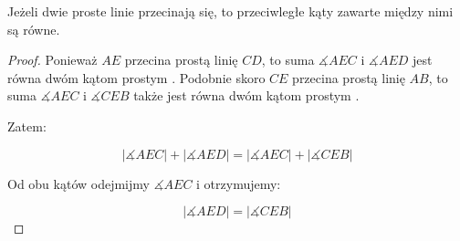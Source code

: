 \documentclass[12pt, a4paper]{scrartcl}
\begin{document}
\begin{theorem}
    Jeżeli dwie proste linie przecinają się, to przeciwległe kąty zawarte
    między nimi są równe.

    \begin{figure}[!h]
        \begin{center}
        \end{center}
    \end{figure}

    \begin{proof}
        Ponieważ \(AE\) przecina prostą linię \(CD\), to suma \(\measuredangle
        AEC\) i \(\measuredangle AED\) jest równa dwóm kątom prostym
        . Podobnie skoro \(CE\) przecina prostą linię \(AB\), to
        suma \(\measuredangle AEC\) i \(\measuredangle CEB\) także jest równa
        dwóm kątom prostym .

        Zatem:

        \[ |\measuredangle AEC| + |\measuredangle AED| =
            |\measuredangle AEC| + |\measuredangle CEB| \]

        Od obu kątów odejmijmy \(\measuredangle AEC\)  i otrzymujemy:

        \[ |\measuredangle AED| = |\measuredangle CEB| \]
    \end{proof}
\end{theorem}
\end{document}
